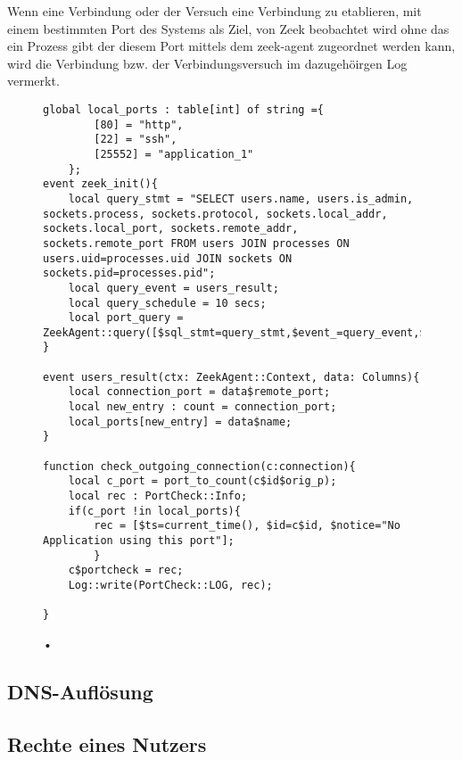  Wenn eine Verbindung oder der Versuch eine Verbindung zu etablieren, mit einem bestimmten Port des Systems als Ziel, von Zeek beobachtet wird ohne das ein Prozess gibt der diesem Port mittels dem zeek-agent zugeordnet werden kann, wird die Verbindung bzw. der Verbindungsversuch im dazugehöirgen Log vermerkt.

\begin{figure}
\begin{lstlisting}
global local_ports : table[int] of string ={
        [80] = "http",
        [22] = "ssh",
        [25552] = "application_1"
    };
event zeek_init(){
    local query_stmt = "SELECT users.name, users.is_admin, sockets.process, sockets.protocol, sockets.local_addr, sockets.local_port, sockets.remote_addr, sockets.remote_port FROM users JOIN processes ON users.uid=processes.uid JOIN sockets ON sockets.pid=processes.pid";
    local query_event = users_result;
    local query_schedule = 10 secs;
    local port_query = ZeekAgent::query([$sql_stmt=query_stmt,$event_=query_event,$schedule_=query_schedule]);
}

event users_result(ctx: ZeekAgent::Context, data: Columns){
    local connection_port = data$remote_port;
   	local new_entry : count = connection_port;
    local_ports[new_entry] = data$name;
}

function check_outgoing_connection(c:connection){
    local c_port = port_to_count(c$id$orig_p);
    local rec : PortCheck::Info;
    if(c_port !in local_ports){
        rec = [$ts=current_time(), $id=c$id, $notice="No Application using this port"];
        }
    c$portcheck = rec;
    Log::write(PortCheck::LOG, rec);
    
}
\end{lstlisting}
\caption{•}
\end{figure}
\subsection{DNS-Auflösung}
\subsection{Rechte eines Nutzers}
\subsection{}